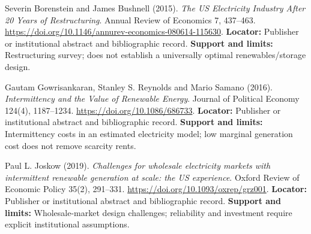 \documentclass[11pt,a4paper]{article}
\begin{document}
\begin{enumerate}[label={[\textnormal{S}\arabic*]},leftmargin=*]

\item Severin Borenstein and James Bushnell (2015). \emph{The US Electricity Industry After 20 Years of Restructuring}. Annual Review of Economics 7, 437–463. \url{https://doi.org/10.1146/annurev-economics-080614-115630}. \textbf{Locator:} Publisher or institutional abstract and bibliographic record. \textbf{Support and limits:} Restructuring survey; does not establish a universally optimal renewables/storage design.

\item Gautam Gowrisankaran, Stanley S. Reynolds and Mario Samano (2016). \emph{Intermittency and the Value of Renewable Energy}. Journal of Political Economy 124(4), 1187–1234. \url{https://doi.org/10.1086/686733}. \textbf{Locator:} Publisher or institutional abstract and bibliographic record. \textbf{Support and limits:} Intermittency costs in an estimated electricity model; low marginal generation cost does not remove scarcity rents.

\item Paul L. Joskow (2019). \emph{Challenges for wholesale electricity markets with intermittent renewable generation at scale: the US experience}. Oxford Review of Economic Policy 35(2), 291–331. \url{https://doi.org/10.1093/oxrep/grz001}. \textbf{Locator:} Publisher or institutional abstract and bibliographic record. \textbf{Support and limits:} Wholesale-market design challenges; reliability and investment require explicit institutional assumptions.

\end{enumerate}
\end{document}
